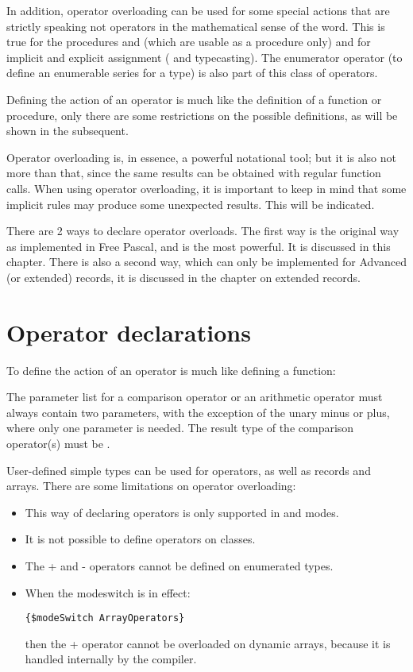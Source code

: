 In addition, operator overloading can be used for some special actions
that are strictly speaking not operators in the mathematical sense of the word.
This is true for the procedures  and  (which are usable as
a procedure only) and for implicit and explicit assignment (\var{:=} and typecasting).
The enumerator operator (to define an enumerable series for a type) is also
part of this class of operators.

Defining the action of an operator is much like the definition of a
function or procedure, only there are some restrictions on the possible
definitions, as will be shown in the subsequent.

Operator overloading is, in essence, a powerful notational tool;
but it is also not more than that, since the same results can be
obtained with regular function calls. When using operator overloading,
it is important to keep in mind that some implicit rules may produce
some unexpected results. This will be indicated.

There are 2 ways to declare operator overloads. The first way is the
original way as implemented in Free Pascal, and is the most powerful.
It is discussed in this chapter. There is also a second way, which can only
be implemented for Advanced (or extended) records, it is discussed in the
chapter on extended records.

\section{Operator declarations}
To define the action of an operator is much like defining a function:

The parameter list for a comparison operator or an arithmetic operator
must always contain two parameters, with the exception of the unary minus or
plus, where only one parameter is needed. The result type of the comparison
operator(s) must be .



User-defined simple types can be used for operators, as well as records and arrays.
There are some limitations on operator overloading:
\begin{itemize}
\item This way of declaring operators is only supported in  and
 modes.
\item It is not possible to define operators on classes. 
\item The + and - operators cannot be defined on enumerated types. 
\item When the  modeswitch is in effect:
\begin{verbatim}
{$modeSwitch ArrayOperators}
\end{verbatim} 
then the + operator cannot be overloaded on dynamic arrays, because it is handled internally
by the compiler.
\end{itemize}

